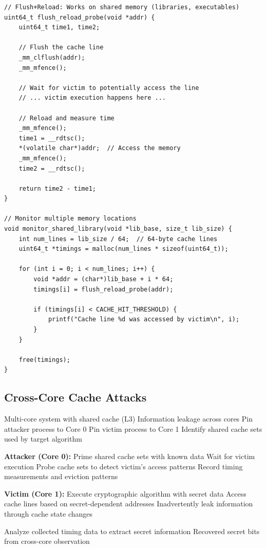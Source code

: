 \documentclass[11pt,a4paper]{article}
\theoremstyle{definition}
\begin{document}
\begin{lstlisting}[caption={Flush+Reload Attack Implementation}]
// Flush+Reload: Works on shared memory (libraries, executables)
uint64_t flush_reload_probe(void *addr) {
    uint64_t time1, time2;
    
    // Flush the cache line
    _mm_clflush(addr);
    _mm_mfence();
    
    // Wait for victim to potentially access the line
    // ... victim execution happens here ...
    
    // Reload and measure time
    _mm_mfence();
    time1 = __rdtsc();
    *(volatile char*)addr;  // Access the memory
    _mm_mfence();
    time2 = __rdtsc();
    
    return time2 - time1;
}

// Monitor multiple memory locations
void monitor_shared_library(void *lib_base, size_t lib_size) {
    int num_lines = lib_size / 64;  // 64-byte cache lines
    uint64_t *timings = malloc(num_lines * sizeof(uint64_t));
    
    for (int i = 0; i < num_lines; i++) {
        void *addr = (char*)lib_base + i * 64;
        timings[i] = flush_reload_probe(addr);
        
        if (timings[i] < CACHE_HIT_THRESHOLD) {
            printf("Cache line %d was accessed by victim\n", i);
        }
    }
    
    free(timings);
}
\end{lstlisting}

\subsection{Cross-Core Cache Attacks}

\begin{algorithm}
\caption{Cross-Core Cache Attack}
\begin{algorithmic}[1]
\REQUIRE Multi-core system with shared cache (L3)
\ENSURE Information leakage across cores
\STATE Pin attacker process to Core 0
\STATE Pin victim process to Core 1
\STATE Identify shared cache sets used by target algorithm

    \STATE \textbf{Attacker (Core 0):}
    \STATE Prime shared cache sets with known data
    \STATE Wait for victim execution
    \STATE Probe cache sets to detect victim's access patterns
    \STATE Record timing measurements and eviction patterns
    
    \STATE \textbf{Victim (Core 1):}
    \STATE Execute cryptographic algorithm with secret data
    \STATE Access cache lines based on secret-dependent addresses
    \STATE Inadvertently leak information through cache state changes
\ENDWHILE

\STATE Analyze collected timing data to extract secret information
\RETURN Recovered secret bits from cross-core observation
\end{algorithmic}
\end{algorithm}
\end{document}
